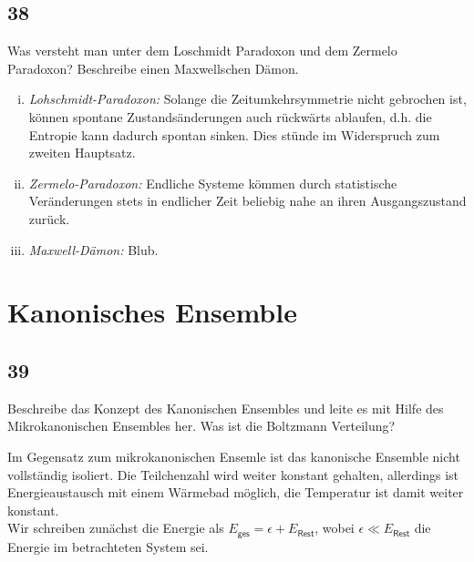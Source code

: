 \subsection{38}
\begin{myfrag}
Was versteht man unter dem Loschmidt Paradoxon und dem Zermelo Paradoxon?
Beschreibe einen Maxwellschen Dämon.
\end{myfrag}
\begin{enumerate}[(i)]
\item\textit{Lohschmidt-Paradoxon:} Solange die Zeitumkehrsymmetrie nicht gebrochen ist, können spontane Zustandsänderungen auch rückwärts ablaufen, d.h. die Entropie kann dadurch spontan sinken. Dies stünde im Widerspruch zum zweiten Hauptsatz.
\item\textit{Zermelo-Paradoxon:} Endliche Systeme kömmen durch statistische Veränderungen stets in endlicher Zeit beliebig nahe an ihren Ausgangszustand zurück.
\item\textit{Maxwell-Dämon:} Blub.
\end{enumerate}
\section{Kanonisches Ensemble}
\subsection{39}
\begin{myfrag}
Beschreibe das Konzept des Kanonischen Ensembles und leite es mit Hilfe des
Mikrokanonischen Ensembles her. Was ist die Boltzmann Verteilung?
\end{myfrag}
Im Gegensatz zum mikrokanonischen Ensemle ist das kanonische Ensemble nicht vollständig isoliert. Die Teilchenzahl wird weiter konstant gehalten, allerdings ist Energieaustausch mit einem Wärmebad möglich, die Temperatur ist damit weiter konstant.\\
Wir schreiben zunächst die Energie als $E_\mathsf{ges}=\epsilon+E_\mathsf{Rest}$, wobei $\epsilon\ll E_\mathsf{Rest}$ die Energie im betrachteten System sei.